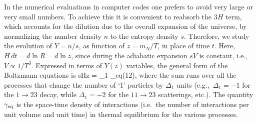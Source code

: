 In the numerical evaluations in computer codes one prefers to avoid very large or very small numbers. To achieve this 
it is convenient to reabsorb the $3H$ term, which accounts for the dilution due to the overall
expansion of the universe, by normalizing the number density $n$ to
the entropy density $s$.
Therefore, we study the evolution of  $Y = n/s$,
as function of $z=m_N/T$,
in place of time $t$.
Here, $H\, dt = d\ln R = d\ln z$, since during the adiabatic
expansion $sV$ is 
constant, i.e.,\ $V\propto 1/T^3$.
Expressed in terms of $Y(z)$ variables, the general form of the Boltzmann equations is
 \beq
 \label{eq:genericBoltz}  
sHz = \sum
 \Delta_{1}\cdot
 \gamma_{\rm eq}(12\cdots {}\cdots),
 \eeq
where the sum runs over all the processes that change the number of
`1' particles by $\Delta_1$ units (e.g.,\ $\Delta_1 = -1$ for the $1\to 23$ decay, while
$\Delta_1 = -2$ for the $11\to 23$ scatterings, etc.). The quantity  $\gamma_{\rm eq}$ is the 
space-time density of interactions (i.e.\ the number of interactions per unit volume and unit time) in thermal equilibrium for the various processes.

